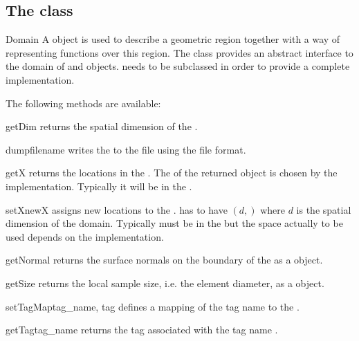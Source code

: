 \subsection{The \Domain class}
\begin{classdesc}{Domain}{}
A \Domain object is used to describe a geometric region together with
a way of representing functions over this region.
The \Domain class provides an abstract interface to the domain of \FunctionSpace and \Data objects.
\Domain needs to be subclassed in order to provide a complete implementation.
\end{classdesc}

\noindent The following methods are available:
\begin{methoddesc}[Domain]{getDim}{}
    returns the spatial dimension of the \Domain.
\end{methoddesc}
%
\begin{methoddesc}[Domain]{dump}{filename}
    writes the \Domain to the file  using the \netCDF file format.
\end{methoddesc}
%
\begin{methoddesc}[Domain]{getX}{}
    returns the locations in the \Domain. The \FunctionSpace of the returned
    \Data object is chosen by the \Domain implementation. Typically it will be
    in the \Function.
\end{methoddesc}
%
\begin{methoddesc}[Domain]{setX}{newX}
    assigns new locations to the \Domain.  has to have \Shape $(d,)$
    where $d$ is the spatial dimension of the domain. Typically 
    must be in the \ContinuousFunction but the space actually to be used
    depends on the \Domain implementation.
\end{methoddesc}
%
\begin{methoddesc}[Domain]{getNormal}{}
    returns the surface normals on the boundary of the \Domain as a \Data object.
\end{methoddesc}
%
\begin{methoddesc}[Domain]{getSize}{}
    returns the local sample size, i.e. the element diameter, as a \Data object.
\end{methoddesc}
%
\begin{methoddesc}[Domain]{setTagMap}{tag_name, tag}
    defines a mapping of the tag name  to the .
\end{methoddesc}
%
\begin{methoddesc}[Domain]{getTag}{tag_name}
    returns the tag associated with the tag name .
\end{methoddesc}
